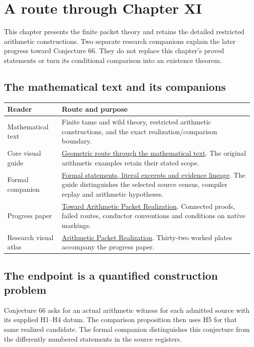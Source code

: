 \begingroup\raggedright
\section*{A route through Chapter XI}
{}
This chapter presents the finite packet theory and retains the detailed restricted arithmetic constructions. Two separate research companions explain the later progress toward Conjecture 66. They do not replace this chapter's proved statements or turn its conditional comparison into an existence theorem.

\subsection*{The mathematical text and its companions}
\begin{tabular}{@{}>{\raggedright\arraybackslash}p{.28\linewidth}>{\raggedright\arraybackslash}p{.67\linewidth}@{}}\toprule
Reader & Route and purpose\\\midrule
Mathematical text & Finite tame and wild theory, restricted arithmetic constructions, and the exact realization/comparison boundary.\\[7pt]
Core visual guide & \href{https://komorebi.invalid/b07/core_visual}{Geometric route through the mathematical text}. The original arithmetic examples retain their stated scope.\\[7pt]
Formal companion & \href{https://komorebi.invalid/b07/core_lean}{Formal statements, literal excerpts and evidence lineage}. The guide distinguishes the selected source census, compiler replay and arithmetic hypotheses.\\[7pt]
Progress paper & \href{https://komorebi.invalid/b07/research_start}{Toward Arithmetic Packet Realization}. Connected proofs, failed routes, conductor conventions and conditions on native markings.\\[7pt]
Research visual atlas & \href{https://komorebi.invalid/b07/atlas_start}{Arithmetic Packet Realization}. Thirty-two worked plates accompany the progress paper.\\\bottomrule
\end{tabular}

\subsection*{The endpoint is a quantified construction problem}
Conjecture 66 asks for an actual arithmetic witness for each admitted source with its supplied H1--H4 datum. The comparison proposition then uses H5 for that same realized candidate. The formal companion distinguishes this conjecture from the differently numbered statements in the source registers.

